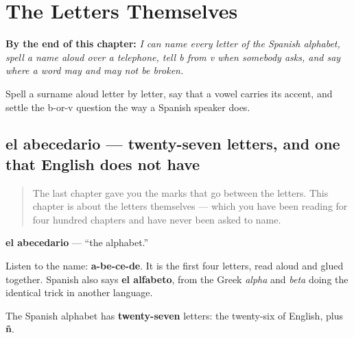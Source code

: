 
\chapter{The Letters Themselves}
\label{ch:abecedario}

\begin{chapteropening}
\textbf{By the end of this chapter:} \emph{I can name every letter of the Spanish alphabet, spell a name aloud over a telephone, tell b from v when somebody asks, and say where a word may and may not be broken.}

Spell a surname aloud letter by letter, say that a vowel carries its accent, and settle the b-or-v question the way a Spanish speaker does.
\end{chapteropening}

\section[el abecedario]{el abecedario — twenty-seven letters, and one that English does not have}

\label{lesson:ES-C425-abecedario}



\begin{quote}
The last chapter gave you the marks that go between the letters. This chapter is about the letters themselves — which you have been reading for four hundred chapters and have never been asked to name.
\end{quote}

\begin{cousinweb}
\textbf{el abecedario} — \textquotedblleft{}the alphabet.\textquotedblright{}

Listen to the name: \textbf{a-be-ce-de}. It is the first four letters, read aloud and glued together. Spanish also says \textbf{el alfabeto}, from the Greek \emph{alpha} and \emph{beta} doing the identical trick in another language.

The Spanish alphabet has \textbf{twenty-seven} letters: the twenty-six of English, plus \textbf{ñ}.
\end{cousinweb}

